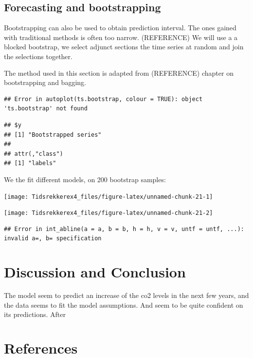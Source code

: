 \documentclass[]{article}
\begin{document}
\hypertarget{forecasting-and-bootstrapping}{%
\subsection{Forecasting and
bootstrapping}\label{forecasting-and-bootstrapping}}

Bootstrapping can also be used to obtain prediction interval. The ones
gained with traditional methods is often too narrow. (REFERENCE) We will
use a a blocked bootstrap, we select adjunct sections the time series at
random and join the selections together.

The method used in this section is adapted from (REFERENCE) chapter on
bootstrapping and bagging.

\begin{verbatim}
## Error in autoplot(ts.bootstrap, colour = TRUE): object 'ts.bootstrap' not found
\end{verbatim}

\begin{verbatim}
## $y
## [1] "Bootstrapped series"
## 
## attr(,"class")
## [1] "labels"
\end{verbatim}

We the fit different models, on 200 bootstrap samples:

\begin{center}\texttt{[image: Tidsrekkerex4\_files/figure-latex/unnamed-chunk-21-1]} \end{center}

\begin{center}\texttt{[image: Tidsrekkerex4\_files/figure-latex/unnamed-chunk-21-2]} \end{center}

\begin{verbatim}
## Error in int_abline(a = a, b = b, h = h, v = v, untf = untf, ...): invalid a=, b= specification
\end{verbatim}

\hypertarget{discussion-and-conclusion}{%
\section{Discussion and Conclusion}\label{discussion-and-conclusion}}

The model seem to predict an increase of the co2 levels in the next few
years, and the data seems to fit the model assumptions. And seem to be
quite confident on its predictions. After

\hypertarget{references}{%
\section{References}\label{references}}
\end{document}
